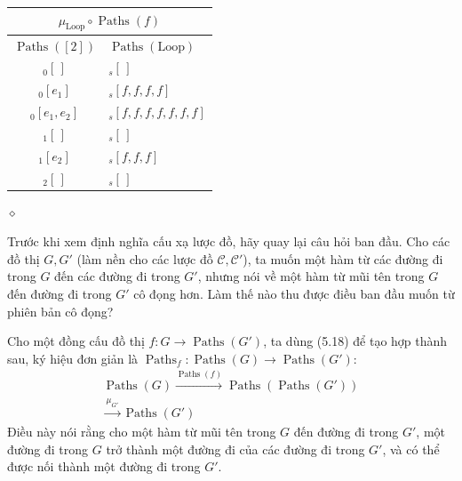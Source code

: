 \begin{enumerate}[label=\alph*.]
\begin{center}\begin{tabular}{|c|l|}\hline\multicolumn{2}{|c|}{$\mu_{\mathrm{Loop}}\circ\operatorname{Paths}(f)$}\\\hline$\operatorname{Paths}([2])$&$\operatorname{Paths}(\mathrm{Loop})$\\\hline${}_{0}[\,]$&${}_{s}[\,]$\\${}_{0}[e_1]$&${}_{s}[f,f,f,f]$\\${}_{0}[e_1,e_2]$&${}_{s}[f,f,f,f,f,f,f]$\\${}_{1}[\,]$&${}_{s}[\,]$\\${}_{1}[e_2]$&${}_{s}[f,f,f]$\\${}_{2}[\,]$&${}_{s}[\,]$\\\hline\end{tabular}\end{center}
\nobreak\hfill$\diamond$
\end{enumerate}

Trước khi xem định nghĩa cấu xạ lược đồ, hãy quay lại câu hỏi ban đầu. Cho các đồ thị $G,G'$ (làm nền cho các lược đồ $\mathcal C,\mathcal C'$), ta muốn một hàm từ các đường đi trong $G$ đến các đường đi trong $G'$, nhưng nói về một hàm từ mũi tên trong $G$ đến đường đi trong $G'$ cô đọng hơn. Làm thế nào thu được điều ban đầu muốn từ phiên bản cô đọng?

Cho một đồng cấu đồ thị $f:G\to\operatorname{Paths}(G')$, ta dùng (5.18) để tạo hợp thành sau, ký hiệu đơn giản là $\operatorname{Paths}_f:\operatorname{Paths}(G)\to\operatorname{Paths}(G')$:
\begin{equation*}\begin{gathered}\operatorname{Paths}(G)\xrightarrow{\operatorname{Paths}(f)}\operatorname{Paths}(\operatorname{Paths}(G'))\\\xrightarrow{\mu_{G'}}\operatorname{Paths}(G')\end{gathered}\tag{5.19}\end{equation*}
Điều này nói rằng cho một hàm từ mũi tên trong $G$ đến đường đi trong $G'$, một đường đi trong $G$ trở thành một đường đi của các đường đi trong $G'$, và có thể được nối thành một đường đi trong $G'$.
